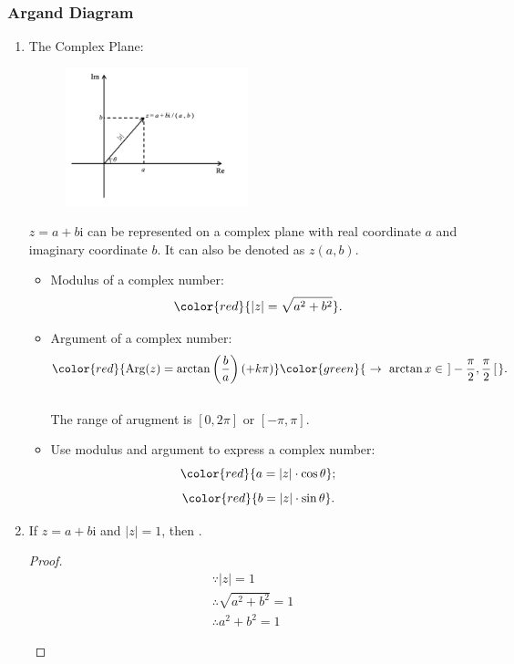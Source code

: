 \documentclass[12pt, a4paper]{article}
\newtheorem{proof}{Proof}[subsection]
\def\i{{\mathrm{i}}}
\def\Arg{{\mathrm{Arg}}}
\begin{document}
\subsubsection{Argand Diagram}
\begin{enumerate}
  \item The Complex Plane: 
  \begin{figure}[H]
    \center
    \includegraphics[width=0.5\textwidth]{Fig.1.1.jpg}
  \end{figure}
  $z=a+b\i$ can be represented on a complex plane with real coordinate $a$ and imaginary coordinate $b$. It can also be denoted as $z(a,b)$.
  \begin{itemize}
    \item Modulus of a complex number: 
    $${\color{red}{\left|z\right|=\sqrt{a^2+b^2}}}.$$
    \item Argument of a complex number: 
    $${\color{red}{\Arg(z)=\arctan\left(\frac{b}{a}\right)(+k\pi)}}{\color{green}{\ \rightarrow\ \arctan x\in\left.\right]-\frac{\pi}{2},\frac{\pi}{2}\left[\right.}}.$$
    {\color{green}{*When determine a complex number, first draw it on the plane to show which quadrant it is in.}}\\
    The range of arugment is $\left[0,2\pi\right]$ or $\left[-\pi,\pi\right]$.
    \item Use modulus and argument to express a complex number: 
    $${\color{red}{a=\left|z\right|\cdot\cos\theta}};$$
    $${\color{red}{b=\left|z\right|\cdot\sin\theta}}.$$
  \end{itemize} 
  \item If $z=a+b\i$ and $|z|=1$, then {}.
  \begin{proof}
    $$\begin{aligned}
      &\because |z|=1\\
      &\therefore \sqrt{a^2+b^2}=1\\
      &\therefore a^2+b^2=1
    \end{aligned}$$
    \begin{multicols}{2}

\end{multicols}
\end{proof}
\end{enumerate}
\end{document}
